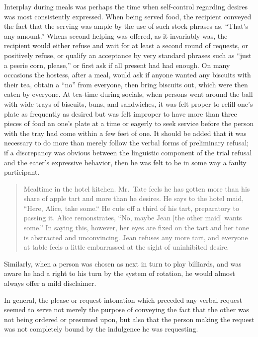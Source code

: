 \documentclass[openany,nobib]{tufte-book}
\begin{document}
Interplay during meals was perhaps the time when self-control regarding
desires was most consistently expressed. When being served food, the
recipient conveyed the fact that the serving was ample by the use of
such stock phrases as, ``That's any amount.'' Whens second helping was
offered, as it invariably was, the recipient would either refuse and
wait for at least a second round of requests, or positively refuse, or
qualify an acceptance by very standard phrases such as ``just a peerie
corn, please,'' or first ask if all present had had enough. On many
occasions the hostess, after a meal, would ask if anyone wanted any
biscuits with their tea, obtain a ``no'' from everyone, then bring
biscuits out, which were then eaten by everyone. At tea-time during
socials, when persons went around the ball with wide trays of biscuits,
buns, and sandwiches, it was felt proper to refill one's plate as
frequently as desired but was felt improper to have more than three
pieces of food an one's plate at a time or eagerly to seek service
before the person with the tray had come within a few feet of one. It
should be added that it was necessary to do more than merely follow the
verbal forms of preliminary refusal; if a discrepancy was obvious
between the linguistic component of the trial refusal and the eater's
expressive behavior, then he was felt to be in some way a faulty
participant.

\begin{quote}
Mealtime in the hotel kitchen. Mr.~Tate feels he has gotten more than
his share of apple tart and more than he desires. He says to the hotel
maid, ``Here, Alice, take some.`` He cuts off a third of his tart,
preparatory to passing it. Alice remonstrates, ``No, maybe Jean {[}the
other maid{]} wants some.'' In saying this, however, her eyes are fixed
on the tart and her tone is abstracted and unconvincing. Jean refuses
any more tart, and everyone at table feels a little embarrassed at the
sight of uninhibited desire.
\end{quote}

\noindent Similarly, when a person was chosen as next in turn to play billiards,
and was aware he had a right to his turn by the system of rotation, he
would almost always offer a mild disclaimer.

In general, the please or request intonation which preceded any verbal
request seemed to serve not merely the purpose of conveying the fact
that the other was not being ordered or presumed upon, but also that the
person making the request was not completely bound by the indulgence he
was requesting.
\end{document}
